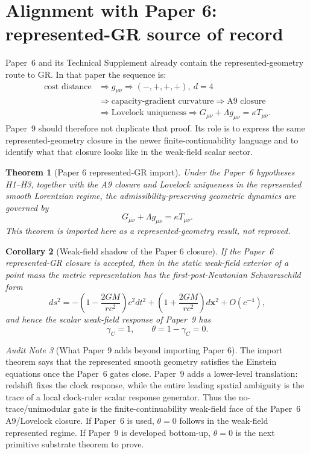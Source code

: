 \documentclass[11pt]{article}
\newtheorem{theorem}{Theorem}[section]
\newtheorem{corollary}[theorem]{Corollary}
\theoremstyle{remark}
\newtheorem{audit}[theorem]{Audit Note}
\begin{document}
\section{Alignment with Paper 6: represented-GR source of record}
\label{sec:paper6-alignment}

Paper~6 and its Technical Supplement already contain the represented-geometry route to GR.  In that paper the sequence is:
\[
\begin{aligned}
\text{cost distance}
&\Rightarrow g_{\mu\nu}
\Rightarrow (-,+,+,+),\ d=4 \\
&\Rightarrow \text{capacity-gradient curvature}
\Rightarrow \text{A9 closure} \\
&\Rightarrow \text{Lovelock uniqueness}
\Rightarrow
G_{\mu\nu}+\Lambda g_{\mu\nu}=\kappa T_{\mu\nu}.
\end{aligned}
\]
Paper~9 should therefore not duplicate that proof.  Its role is to express the same represented-geometry closure in the newer finite-continuability language and to identify what that closure looks like in the weak-field scalar sector.

\begin{theorem}[Paper 6 represented-GR import]
\label{thm:paper6-gr-import}
Under the Paper~6 hypotheses H1--H3, together with the A9 closure and Lovelock uniqueness in the represented smooth Lorentzian regime, the admissibility-preserving geometric dynamics are governed by
\[
        G_{\mu\nu}+\Lambda g_{\mu\nu}=\kappa T_{\mu\nu}.
\]
This theorem is imported here as a represented-geometry result, not reproved.
\end{theorem}

\begin{corollary}[Weak-field shadow of the Paper 6 closure]
\label{cor:paper6-weak-field-shadow}
If the Paper~6 represented-GR closure is accepted, then in the static weak-field exterior of a point mass the metric representation has the first-post-Newtonian Schwarzschild form
\[
        ds^2
        =-
        \left(1-\frac{2GM}{rc^2}\right)c^2dt^2
        +
        \left(1+\frac{2GM}{rc^2}\right)d\mathbf x^2
        +O(c^{-4}),
\]
and hence the scalar weak-field response of Paper~9 has
\[
        \gamma_C=1,
        \qquad
        \theta=1-\gamma_C=0.
\]
\end{corollary}

\begin{audit}[What Paper 9 adds beyond importing Paper 6]
The import theorem says that the represented smooth geometry satisfies the Einstein equations once the Paper~6 gates close.  Paper~9 adds a lower-level translation: redshift fixes the clock response, while the entire leading spatial ambiguity is the trace of a local clock-ruler scalar response generator.  Thus the no-trace/unimodular gate is the finite-continuability weak-field face of the Paper~6 A9/Lovelock closure.  If Paper~6 is used, \(\theta=0\) follows in the weak-field represented regime.  If Paper~9 is developed bottom-up, \(\theta=0\) is the next primitive substrate theorem to prove.
\end{audit}
\end{document}
